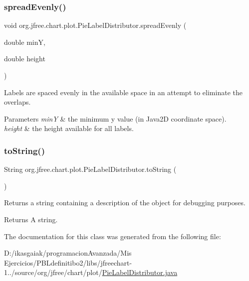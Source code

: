 \subsubsection{\texorpdfstring{spread\+Evenly()}{spreadEvenly()}}
{\footnotesize\ttfamily void org.\+jfree.\+chart.\+plot.\+Pie\+Label\+Distributor.\+spread\+Evenly (\begin{DoxyParamCaption}\item[{double}]{minY,  }\item[{double}]{height }\end{DoxyParamCaption})\hspace{0.3cm}{\ttfamily [protected]}}

Labels are spaced evenly in the available space in an attempt to eliminate the overlaps.


\begin{DoxyParams}{Parameters}
{\em minY} & the minimum y value (in Java2D coordinate space). \\
\hline
{\em height} & the height available for all labels. \\
\hline
\end{DoxyParams}
\mbox{\label{classorg_1_1jfree_1_1chart_1_1plot_1_1_pie_label_distributor_a72726fbc62dfdb2bf6d80c6ea78311b9}} 
\subsubsection{\texorpdfstring{to\+String()}{toString()}}
{\footnotesize\ttfamily String org.\+jfree.\+chart.\+plot.\+Pie\+Label\+Distributor.\+to\+String (\begin{DoxyParamCaption}{ }\end{DoxyParamCaption})}

Returns a string containing a description of the object for debugging purposes.

\begin{DoxyReturn}{Returns}
A string. 
\end{DoxyReturn}


The documentation for this class was generated from the following file\+:\begin{DoxyCompactItemize}
\item 
D\+:/ikasgaiak/programacion\+Avanzada/\+Mis Ejercicios/\+P\+B\+Ldefinitibo2/libs/jfreechart-\/1../source/org/jfree/chart/plot/\mbox{\hyperlink{_pie_label_distributor_8java}{Pie\+Label\+Distributor.\+java}}\end{DoxyCompactItemize}
